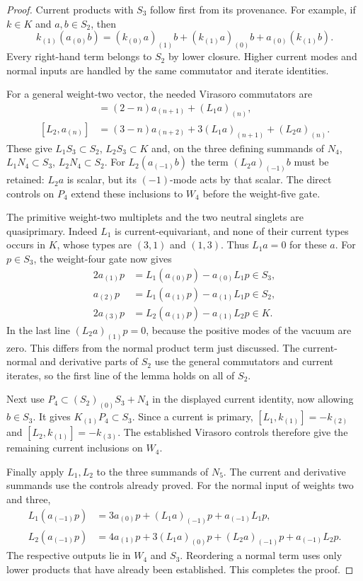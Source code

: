 \begin{proof}
Current products with $S_3$ follow first from its provenance.
For example, if $k\in K$ and $a,b\in S_2$, then
\[
 k_{(1)}(a_{(0)}b)
  =(k_{(0)}a)_{(1)}b+(k_{(1)}a)_{(0)}b
                           +a_{(0)}(k_{(1)}b).
\]
Every right-hand term belongs to $S_2$ by lower closure.
Higher current modes and normal inputs are handled by the same
commutator and iterate identities.

For a general weight-two vector, the needed Virasoro commutators are
\begin{align*}
 [L_1,a_{(n)}]&=(2-n)a_{(n+1)}+(L_1a)_{(n)},\\
 [L_2,a_{(n)}]&=(3-n)a_{(n+2)}
                     +3(L_1a)_{(n+1)}+(L_2a)_{(n)}.
\end{align*}
These give $L_1S_3\subset S_2$, $L_2S_3\subset K$ and,
on the three defining summands of $N_4$,
$L_1N_4\subset S_3$, $L_2N_4\subset S_2$.
For $L_2(a_{(-1)}b)$ the term $(L_2a)_{(-1)}b$
must be retained: $L_2a$ is scalar, but its $(-1)$-mode
acts by that scalar. The direct controls on $P_4$ extend these
inclusions to $W_4$ before the weight-five gate.

The primitive weight-two multiplets and the two neutral singlets
are quasiprimary. Indeed $L_1$ is current-equivariant, and none
of their current types occurs in $K$, whose types are $(3,1)$
and $(1,3)$. Thus $L_1a=0$ for these $a$. For $p\in S_3$,
the weight-four gate now gives
\begin{align*}
 2a_{(1)}p&=L_1(a_{(0)}p)-a_{(0)}L_1p\in S_3,\\
 a_{(2)}p&=L_1(a_{(1)}p)-a_{(1)}L_1p\in S_2,\\
 2a_{(3)}p&=L_2(a_{(1)}p)-a_{(1)}L_2p\in K.
\end{align*}
In the last line $(L_2a)_{(1)}p=0$, because the positive
modes of the vacuum are zero. This differs from the normal
product term just discussed. The current-normal and derivative
parts of $S_2$ use the general commutators and current iterates,
so the first line of the lemma holds on all of $S_2$.

Next use $P_4\subset(S_2)_{(0)}S_3+N_4$ in the displayed
current identity, now allowing $b\in S_3$. It gives
$K_{(1)}P_4\subset S_3$. Since a current is primary,
$[L_1,k_{(1)}]=-k_{(2)}$ and
$[L_2,k_{(1)}]=-k_{(3)}$.
The established Virasoro controls therefore give the remaining
current inclusions on $W_4$.

Finally apply $L_1,L_2$ to the three summands of $N_5$.
The current and derivative summands use the controls already proved.
For the normal input of weights two and three,
\begin{align*}
 L_1(a_{(-1)}p)
   &=3a_{(0)}p+(L_1a)_{(-1)}p+a_{(-1)}L_1p,\\
 L_2(a_{(-1)}p)
   &=4a_{(1)}p+3(L_1a)_{(0)}p
                  +(L_2a)_{(-1)}p+a_{(-1)}L_2p.
\end{align*}
The respective outputs lie in $W_4$ and $S_3$. Reordering a
normal term uses only lower products that have already been
established. This completes the proof.
\end{proof}

